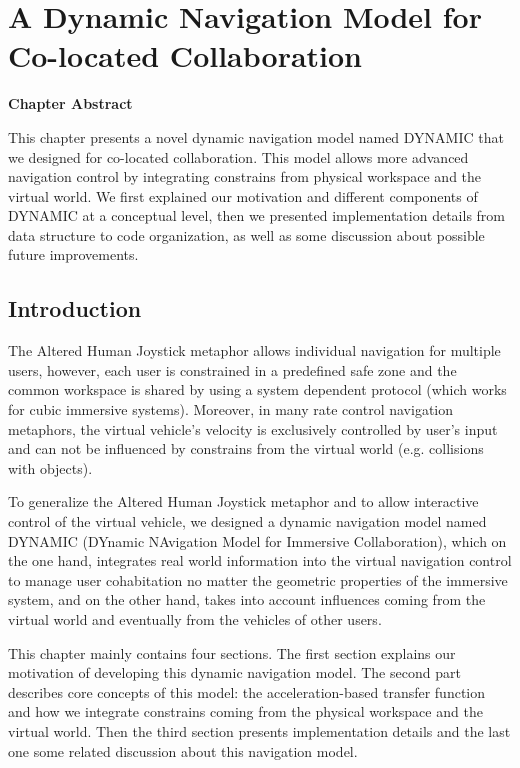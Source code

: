 \chapter{A Dynamic Navigation Model for Co-located Collaboration}
\label{chapter:dynamic_model}
\pagebreak

\textbf{Chapter Abstract}

This chapter presents a novel dynamic navigation model named DYNAMIC that we designed for co-located collaboration. This model allows more advanced navigation control by integrating constrains from physical workspace and the virtual world. We first explained our motivation and different components of DYNAMIC at a conceptual level, then we presented implementation details from data structure to code organization, as well as some discussion about possible future improvements.

\vspace*{2\baselineskip}

\minitoc

\newpage
\section{Introduction}
The Altered Human Joystick metaphor allows individual navigation for multiple users, however, each user is constrained in a predefined safe zone and the common workspace is shared by using a system dependent protocol (which works for cubic immersive systems). Moreover, in many rate control navigation metaphors, the virtual vehicle's velocity is exclusively controlled by user's input and can not be influenced by constrains from the virtual world (e.g. collisions with objects). 

To generalize the Altered Human Joystick metaphor and to allow interactive control of the virtual vehicle, we designed a dynamic navigation model named DYNAMIC (DYnamic NAvigation Model for Immersive Collaboration), which on the one hand, integrates real world information into the virtual navigation control to manage user cohabitation no matter the geometric properties of the immersive system, and on the other hand, takes into account influences coming from the virtual world and eventually from the vehicles of other users.

This chapter mainly contains four sections. The first section explains our motivation of developing this dynamic navigation model. The second part describes core concepts of this model: the acceleration-based transfer function and how we integrate constrains coming from the physical workspace and the virtual world. Then the third section presents implementation details and the last one some related discussion about this navigation model.


